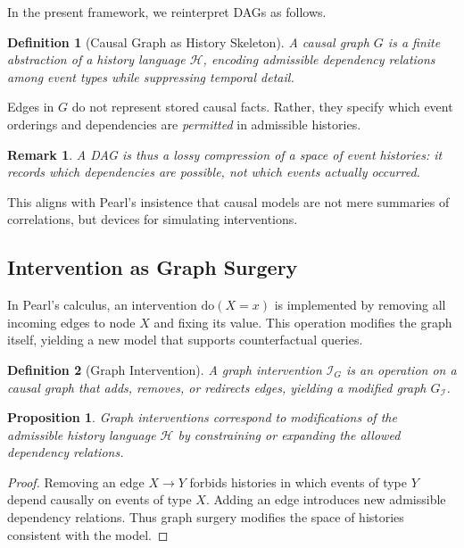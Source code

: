 \documentclass[11pt]{article}
\newtheorem{definition}{Definition}
\newtheorem{remark}{Remark}
\newtheorem{proposition}{Proposition}
\begin{document}
In the present framework, we reinterpret DAGs as follows.

\begin{definition}[Causal Graph as History Skeleton]
A causal graph $G$ is a finite abstraction of a history language $\mathcal{H}$, encoding admissible dependency relations among event types while suppressing temporal detail.
\end{definition}

Edges in $G$ do not represent stored causal facts. Rather, they specify which event orderings and dependencies are \emph{permitted} in admissible histories.

\begin{remark}
A DAG is thus a lossy compression of a space of event histories: it records which dependencies are possible, not which events actually occurred.
\end{remark}

This aligns with Pearl’s insistence that causal models are not mere summaries of correlations, but devices for simulating interventions.

\subsection{Intervention as Graph Surgery}

In Pearl’s calculus, an intervention $\text{do}(X=x)$ is implemented by removing all incoming edges to node $X$ and fixing its value. This operation modifies the graph itself, yielding a new model that supports counterfactual queries.

\begin{definition}[Graph Intervention]
A graph intervention $\mathcal{I}_G$ is an operation on a causal graph that adds, removes, or redirects edges, yielding a modified graph $G_{\mathcal{I}}$.
\end{definition}

\begin{proposition}
Graph interventions correspond to modifications of the admissible history language $\mathcal{H}$ by constraining or expanding the allowed dependency relations.
\end{proposition}

\begin{proof}
Removing an edge $X \rightarrow Y$ forbids histories in which events of type $Y$ depend causally on events of type $X$. Adding an edge introduces new admissible dependency relations. Thus graph surgery modifies the space of histories consistent with the model.
\end{proof}
\end{document}
